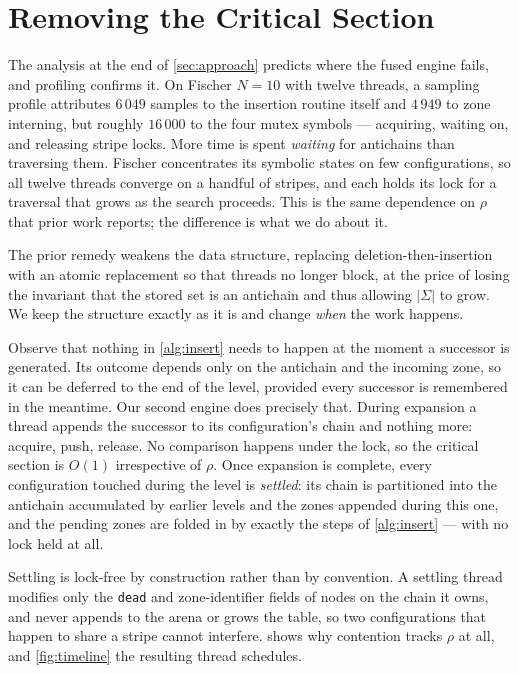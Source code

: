 \section{Removing the Critical Section}\label{sec:batching}

The analysis at the end of \cref{sec:approach} predicts where the fused engine fails, and
profiling confirms it. On Fischer $N{=}10$ with twelve threads, a sampling profile attributes
$6\,049$ samples to the insertion routine itself and $4\,949$ to zone interning, but roughly
$16\,000$ to the four mutex symbols --- acquiring, waiting on, and releasing stripe locks.
More time is spent \emph{waiting} for antichains than traversing them. Fischer concentrates
its symbolic states on few configurations, so all twelve threads converge on a handful of
stripes, and each holds its lock for a traversal that grows as the search proceeds. This is
the same dependence on $\rho$ that prior work reports; the difference is what we do about it.

The prior remedy weakens the data structure, replacing deletion-then-insertion with an atomic
replacement so that threads no longer block, at the price of losing the invariant that the
stored set is an antichain and thus allowing $|\Sigma|$ to grow. We keep the structure exactly
as it is and change \emph{when} the work happens.

Observe that nothing in \cref{alg:insert} needs to happen at the moment a successor is
generated. Its outcome depends only on the antichain and the incoming zone, so it can be
deferred to the end of the level, provided every successor is remembered in the meantime. Our
second engine does precisely that. During expansion a thread appends the successor to its
configuration's chain and nothing more: acquire, push, release. No comparison happens under
the lock, so the critical section is $O(1)$ irrespective of $\rho$. Once expansion is
complete, every configuration touched during the level is \emph{settled}: its chain is
partitioned into the antichain accumulated by earlier levels and the zones appended during
this one, and the pending zones are folded in by exactly the steps of \cref{alg:insert} ---
with no lock held at all.

Settling is lock-free by construction rather than by convention. A settling thread modifies
only the \texttt{dead} and zone-identifier fields of nodes on the chain it owns, and never
appends to the arena or grows the table, so two configurations that happen to share a stripe
cannot interfere.  shows why contention tracks $\rho$ at all, and \cref{fig:timeline} the resulting thread schedules.

